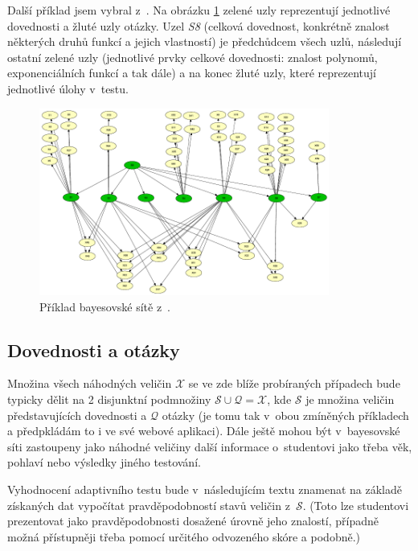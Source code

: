 \documentclass[a4paper,twoside,12pt]{scrbook}
\begin{document}
Další příklad jsem vybral z~\cite{plajner16}. Na obrázku \ref{fig:complex_BN_plajner16} zelené uzly reprezentují jednotlivé dovednosti a žluté uzly otázky. Uzel \emph{S8} (celková dovednost, konkrétně znalost některých druhů funkcí a jejich vlastností) je předchůdcem všech uzlů, následují ostatní zelené uzly (jednotlivé prvky celkové dovednosti: znalost polynomů, exponenciálních funkcí a tak dále) a na konec žluté uzly, které reprezentují jednotlivé úlohy v~testu.

\begin{figure}
  \centering
    \includegraphics[width=0.85\textwidth]{complex_BN_plajner16.pdf}
  \caption{Příklad bayesovské sítě z~\cite{plajner16}.}
  \label{fig:complex_BN_plajner16}
\end{figure}

\subsection{Dovednosti a otázky}
Množina všech náhodných veličin $\mathcal{X}$ se ve zde blíže probíraných případech bude typicky dělit na 2 disjunktní podmnožiny $\mathcal{S} \cup \mathcal{Q} = \mathcal{X}$, kde $\mathcal{S}$ je množina veličin představujících dovednosti a $\mathcal{Q}$ otázky (je tomu tak v~obou zmíněných příkladech a předpkládám to i ve své webové aplikaci). Dále ještě mohou být v~bayesovské síti zastoupeny jako náhodné veličiny další informace o~studentovi jako třeba věk, pohlaví nebo výsledky jiného testování.

Vyhodnocení adaptivního testu bude v~následujícím textu znamenat na základě získaných dat vypočítat pravděpodobností stavů veličin z~$\mathcal{S}$. (Toto lze studentovi prezentovat jako pravděpodobnosti dosažené úrovně jeho znalostí, případně možná přístupněji třeba pomocí určitého odvozeného skóre a podobně.)
\end{document}
